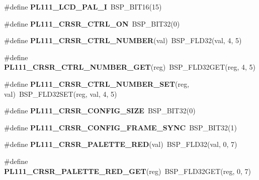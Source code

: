 \begin{DoxyCompactItemize}
\#define {\bfseries P\+L111\+\_\+\+L\+C\+D\+\_\+\+P\+A\+L\+\_\+I}~B\+S\+P\+\_\+\+B\+I\+T16(15)
\item 
\mbox{\label{arm-pl111-regs_8h_a81ccfd3180b2b69086528748c090dcd3}} 
\#define {\bfseries P\+L111\+\_\+\+C\+R\+S\+R\+\_\+\+C\+T\+R\+L\+\_\+\+ON}~B\+S\+P\+\_\+\+B\+I\+T32(0)
\item 
\mbox{\label{arm-pl111-regs_8h_a0af7a07dcd44ee771ed0a26ec6d2a601}} 
\#define {\bfseries P\+L111\+\_\+\+C\+R\+S\+R\+\_\+\+C\+T\+R\+L\+\_\+\+N\+U\+M\+B\+ER}(val)~B\+S\+P\+\_\+\+F\+L\+D32(val, 4, 5)
\item 
\mbox{\label{arm-pl111-regs_8h_aa535b94c5f006f5022c16973241f6c94}} 
\#define {\bfseries P\+L111\+\_\+\+C\+R\+S\+R\+\_\+\+C\+T\+R\+L\+\_\+\+N\+U\+M\+B\+E\+R\+\_\+\+G\+ET}(reg)~B\+S\+P\+\_\+\+F\+L\+D32\+G\+ET(reg, 4, 5)
\item 
\mbox{\label{arm-pl111-regs_8h_a07c789c8a23643642ddf7e82d5d430b3}} 
\#define {\bfseries P\+L111\+\_\+\+C\+R\+S\+R\+\_\+\+C\+T\+R\+L\+\_\+\+N\+U\+M\+B\+E\+R\+\_\+\+S\+ET}(reg,  val)~B\+S\+P\+\_\+\+F\+L\+D32\+S\+ET(reg, val, 4, 5)
\item 
\mbox{\label{arm-pl111-regs_8h_a7713541680cc89093406a2952e823072}} 
\#define {\bfseries P\+L111\+\_\+\+C\+R\+S\+R\+\_\+\+C\+O\+N\+F\+I\+G\+\_\+\+S\+I\+ZE}~B\+S\+P\+\_\+\+B\+I\+T32(0)
\item 
\mbox{\label{arm-pl111-regs_8h_a1f36056ee5226e3dc3cc2aa0ea97dfa9}} 
\#define {\bfseries P\+L111\+\_\+\+C\+R\+S\+R\+\_\+\+C\+O\+N\+F\+I\+G\+\_\+\+F\+R\+A\+M\+E\+\_\+\+S\+Y\+NC}~B\+S\+P\+\_\+\+B\+I\+T32(1)
\item 
\mbox{\label{arm-pl111-regs_8h_a360ed415c3fe21864c9da3fdf76162f4}} 
\#define {\bfseries P\+L111\+\_\+\+C\+R\+S\+R\+\_\+\+P\+A\+L\+E\+T\+T\+E\+\_\+\+R\+ED}(val)~B\+S\+P\+\_\+\+F\+L\+D32(val, 0, 7)
\item 
\mbox{\label{arm-pl111-regs_8h_ad137471f57f68503c1236ccfa225e349}} 
\#define {\bfseries P\+L111\+\_\+\+C\+R\+S\+R\+\_\+\+P\+A\+L\+E\+T\+T\+E\+\_\+\+R\+E\+D\+\_\+\+G\+ET}(reg)~B\+S\+P\+\_\+\+F\+L\+D32\+G\+ET(reg, 0, 7)

\end{DoxyCompactItemize}
